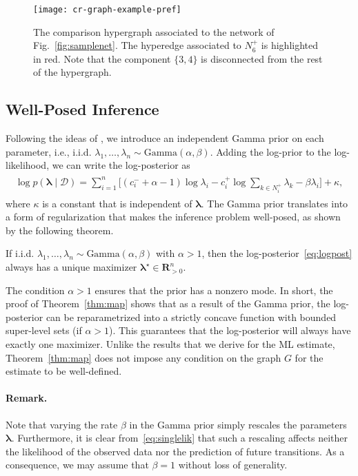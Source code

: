 \begin{figure}[t]
  \centering
  \texttt{[image: cr-graph-example-pref]}
  \caption{The comparison hypergraph associated to the network of Fig.~\ref{fig:samplenet}.
The hyperedge associated to $N^+_6$ is highlighted in red.
Note that the component $\{3, 4\}$ is disconnected from the rest of the hypergraph.}
  \label{fig:samplehyp}
\end{figure}


\subsection{Well-Posed Inference}

Following the ideas of \citet{caron2012efficient}, we introduce an independent Gamma prior on each parameter, i.e., i.i.d. $\lambda_1, \ldots, \lambda_n \sim \text{Gamma}(\alpha, \beta)$.
Adding the log-prior to the log-likelihood, we can write the log-posterior as
\begin{align}
\begin{aligned}
\label{eq:logpost}
\log p(\bm{\lambda} \mid \mathcal{D}) = \sum_{i = 1}^n
  \bigg[ (c^-_i + \alpha - 1) \log \lambda_i
        - c^+_i \log\!\sum_{k \in N^+_i}\!\lambda_k  - \beta \lambda_i \bigg] + \kappa,
\end{aligned}
\end{align}
where $\kappa$ is a constant that is independent of $\bm{\lambda}$.
The Gamma prior translates into a form of regularization that makes the inference problem well-posed, as shown by the following theorem.

\begin{theorem}
\label{thm:map}
If i.i.d. $\lambda_1, \ldots, \lambda_n \sim \text{Gamma}(\alpha, \beta)$ with $\alpha > 1$, then the log-posterior~\eqref{eq:logpost} always has a unique maximizer $\bm{\lambda}^\star \in \mathbf{R}^n_{>0}$.
\end{theorem}

The condition $\alpha > 1$ ensures that the prior has a nonzero mode.
In short, the proof of Theorem~\ref{thm:map} shows that as a result of the Gamma prior, the log-posterior can be reparametrized into a strictly concave function with bounded super-level sets (if $\alpha > 1$).
This guarantees that the log-posterior will always have exactly one maximizer.
Unlike the results that we derive for the ML estimate, Theorem~\ref{thm:map} does not impose any condition on the graph $G$ for the estimate to be well-defined.

\paragraph{Remark.}
Note that varying the rate $\beta$ in the Gamma prior simply rescales the parameters $\bm{\lambda}$.
Furthermore, it is clear from~\eqref{eq:singlelik} that such a rescaling affects neither the likelihood of the observed data nor the prediction of future transitions.
As a consequence, we may assume that $\beta = 1$ without loss of generality.
